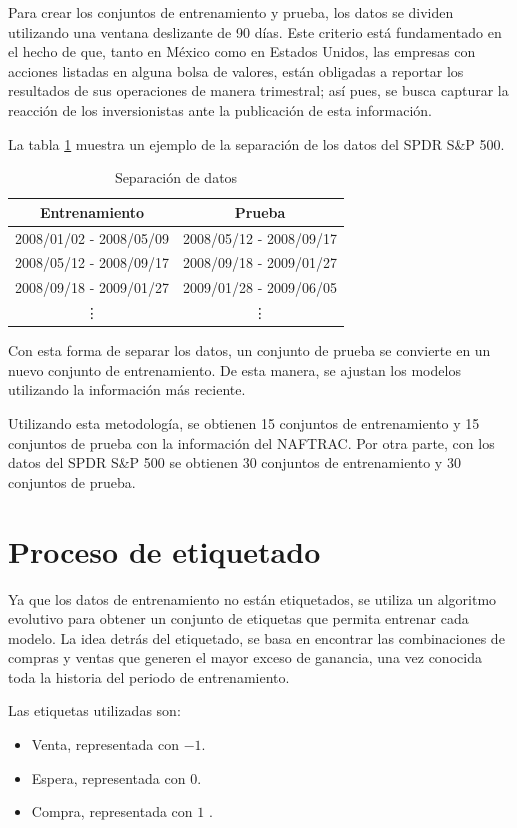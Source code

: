 \documentclass[12pt]{report}
\theoremstyle{break}
\theoremstyle{break}
\begin{document}
Para crear los conjuntos de entrenamiento y prueba, los datos se dividen utilizando una ventana deslizante de 90 días. Este criterio está fundamentado en el hecho de que, tanto en México como en Estados Unidos, las empresas con acciones listadas en alguna bolsa de valores, están obligadas a reportar los resultados de sus operaciones de manera trimestral; así pues, se busca capturar la reacción de los inversionistas ante la publicación de esta información.

La tabla \ref{tabla:data split SP500} muestra un ejemplo de la separación de los datos del SPDR S\&P 500.
\begin{table}[h]
\centering
\begin{tabular}{cc}
\hline
\textbf{Entrenamiento} & \textbf{Prueba} \\
\hline
2008/01/02 - 2008/05/09 & 2008/05/12 - 2008/09/17 \\
2008/05/12 - 2008/09/17 & 2008/09/18 - 2009/01/27 \\
2008/09/18 - 2009/01/27 & 2009/01/28 - 2009/06/05 \\
\vdots & \vdots \\
\hline
\end{tabular}
\caption{\label{tabla:data split SP500} Separación de datos}
\end{table}

Con esta forma de separar los datos, un conjunto de prueba se convierte en un nuevo conjunto de entrenamiento. De esta manera, se ajustan los modelos utilizando la información más reciente.

Utilizando esta metodología, se obtienen 15 conjuntos de entrenamiento y 15 conjuntos de prueba con la información del NAFTRAC. Por otra parte, con los datos del SPDR S\&P 500 se obtienen 30 conjuntos de entrenamiento y 30 conjuntos de prueba.

\section{Proceso de etiquetado}
\label{seccion:proceso etiquetado}
Ya que los datos de entrenamiento no están etiquetados, se utiliza un algoritmo evolutivo para obtener un conjunto de etiquetas que permita entrenar cada modelo. La idea detrás del etiquetado, se basa en encontrar las combinaciones de compras y ventas que generen el mayor exceso de ganancia, una vez conocida toda la historia del periodo de entrenamiento.

Las etiquetas utilizadas son:
\begin{itemize}
\item Venta, representada con $-1$.

\item Espera, representada con $0$.

\item Compra, representada con $1$ .
\end{itemize}
\end{document}
